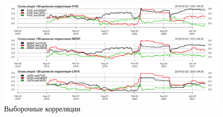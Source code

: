\documentclass[a4paper,12pt,twoside]{article}
\begin{document}
\begin{figure}[h]
    \includegraphics[scale = 0.4]{mult_corr.png}
    \caption{Выборочные корреляции}
    \label{fig:rollcorr2}
\end{figure}

\end{document}
